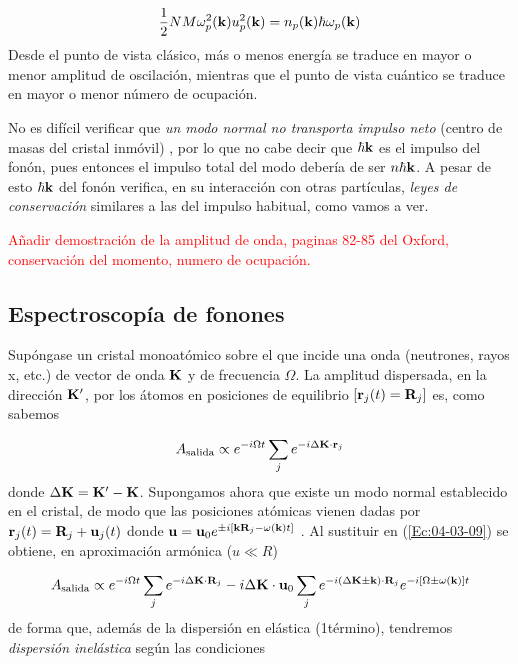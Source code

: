 \begin{equation}
    \frac{1}{2} N M \omega_p^2 (\mathbf{k}) u_p^2 (\mathbf{k}) = n_p (\mathbf{k}) \hbar \omega_p (\mathbf{k})
\end{equation}
Desde el punto de vista clásico, más o menos energía se traduce en mayor o menor amplitud de oscilación, mientras que el punto de vista cuántico se traduce en mayor o menor número de ocupación. 

No es difícil verificar que \textit{un modo normal no transporta impulso neto} (centro de masas del cristal inmóvil) , por lo que no cabe decir que $\hbar \mathbf{k}$ es el impulso del fonón, pues entonces el impulso total del modo debería de ser $n \hbar \mathbf{k}$. A pesar de esto $\hbar \mathbf{k}$ del fonón verifica, en su interacción con otras partículas, \textit{leyes de conservación} similares a las del impulso habitual, como vamos a ver.


\begin{Anotacion}
	\textcolor{red}{Añadir demostración de la amplitud de onda, paginas 82-85 del Oxford, conservación del momento, numero de ocupación.}
\end{Anotacion}	

\subsection{Espectroscopía de fonones}

Supóngase un cristal monoatómico sobre el que incide una onda (neutrones, rayos x, etc.) de vector de onda $\mathbf{K}$ y de frecuencia $\Omega$. La amplitud dispersada, en la dirección $\mathbf{K}'$, por los átomos en posiciones de equilibrio $[\mathbf{r}_j (t)= \mathbf{R}_j]$ es, como sabemos

\begin{equation}
    A_{\text{salida}} \propto e^{-i \Omega t } \sum_j e^{-i \Delta \mathbf{K} \cdot \mathbf{r}_j} \label{Ec:04-03-09}
\end{equation}
donde $\Delta \mathbf{K} = \mathbf{K} ' - \mathbf{K}$. Supongamos ahora que existe un modo normal establecido en el cristal, de modo que las posiciones atómicas vienen dadas por $\mathbf{r}_j(t) = \mathbf{R}_j + \mathbf{u}_j (t)$ donde $\mathbf{u}=\mathbf{u}_0  e^{\pm i \left[ \mathbf{k} \mathbf{R}_j -  \omega (\mathbf{k})t \right]}$ . Al sustituir en (\ref{Ec:04-03-09}) se obtiene, en aproximación armónica ($u \ll R$) 

\begin{equation}
    A_{\text{salida}} \propto e^{-i\Omega t} \sum_j e^{-i\Delta \mathbf{K} \cdot \mathbf{R}_j} - i \Delta \mathbf{K} \cdot \mathbf{u}_0 \sum_j e^{- i (\Delta \mathbf{K} \pm \mathbf{k}) \cdot \mathbf{R}_j} e^{- i \left[ \Omega \pm \omega (\mathbf{k}) \right]t}
\end{equation}
de forma que, además de la dispersión en elástica (1\er término), tendremos \textit{dispersión inelástica} según las condiciones 

